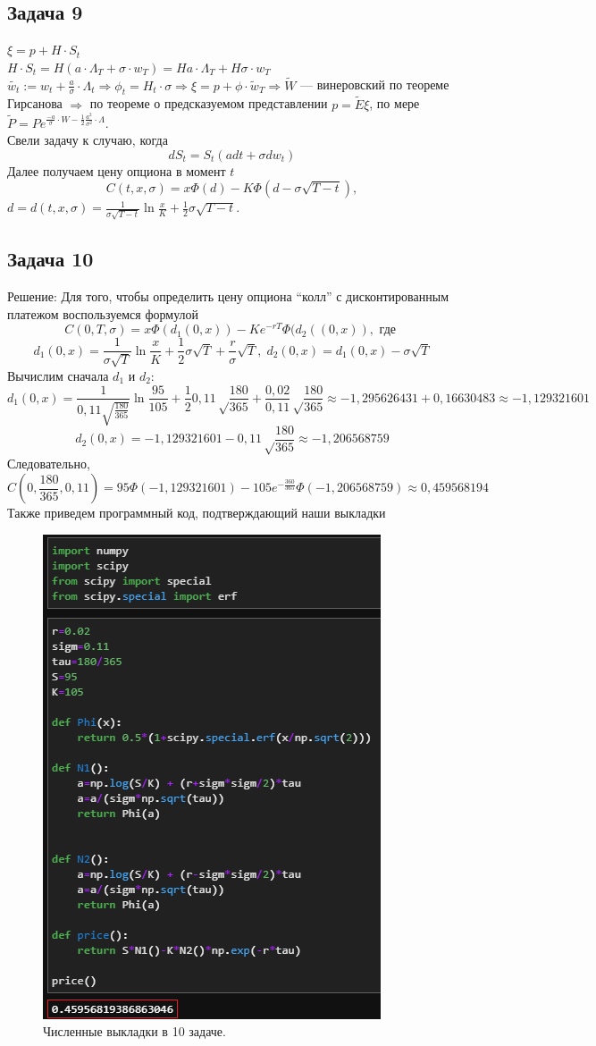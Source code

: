 \documentclass[12pt]{article}
\begin{document}
\subsection{Задача 9}
$\xi=p+H\cdot S_t$\\
$H\cdot S_t=H(a\cdot\Lambda_T+\sigma\cdot w_T)=Ha\cdot\Lambda_T+H\sigma\cdot w_T$\\
$\tilde {w_t}:= w_t+\frac{a}{\sigma}\cdot\Lambda_t\Rightarrow \phi_t=H_t\cdot\sigma\Rightarrow\xi=p+\phi\cdot \tilde w_T\Rightarrow \tilde W$ — винеровский по теореме Гирсанова $\Rightarrow$ по теореме о предсказуемом представлении $p =\tilde E\xi$, по мере $\tilde P = P e^{\frac{-a}{\sigma}\cdot W-\frac{1}{2}\frac{a^2}{\sigma^2}\cdot\Lambda}.$\\
Свели задачу к случаю, когда $$dS_t=S_t(adt+\sigma dw_t)$$
Далее получаем цену опциона в момент $t$
$$C(t,x,\sigma)=x\Phi(d)-K\Phi(d-\sigma\sqrt{T-t}),$$
$d=d(t,x,\sigma)=\frac{1}{\sigma\sqrt{T-t}}\ln{\frac{x}{K}}+\frac{1}{2}\sigma\sqrt{T-t}$.
\subsection{Задача 10}
Решение: Для того, чтобы определить цену опциона ``колл'' с дисконтированным платежом воспользуемся формулой
$$C(0,T,\sigma)=x\Phi(d_1(0,x))-Ke^{-rT}\Phi(d_2((0,x)), \text{ где }$$
$$d_1(0,x)=\frac{1}{\sigma \sqrt T}\ln\frac xK +\frac 12 \sigma\sqrt T+\frac r\sigma \sqrt T, \; d_2(0,x)=d_1(0,x)-\sigma\sqrt T$$
Вычислим сначала $d_1$ и $d_2$:
$$d_1(0,x)=\frac{1}{0,11 \sqrt {\frac{180}{365}}}\ln\frac{95}{105} +\frac{1}{2} 0,11\sqrt\frac{180}{365}+\frac {0,02}{0,11} \sqrt\frac{180}{365}\approx -1,295626431+0,16630483\approx-1,129321601$$
$$d_2(0,x)=-1,129321601-0,11\sqrt\frac{180}{365}\approx-1,206568759$$
Следовательно,
$$C(0,\frac{180}{365},0,11)=95\Phi(-1,129321601)-105e^{-\frac{360}{365}}\Phi(-1,206568759)\approx 0,459568194$$
Также приведем программный код, подтверждающий наши выкладки

\begin{figure}[h]
\centering
\includegraphics[scale=1]{images/1.png}
\caption{Численные выкладки в 10 задаче.}
\end{figure}
\end{document}
